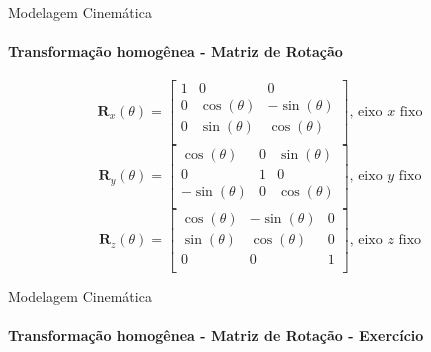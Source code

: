 \documentclass{beamer}
\begin{document}
\begin{frame}{Modelagem Cinemática}
    \framesubtitle{Transformação homogênea - Matriz de Rotação}
    \begin{block}{}
        \begin{equation*}
            \mathbf{R}_x(\theta) =
            \begin{bmatrix}
                1 & 0            & 0             \\
                0 & \cos(\theta) & -\sin(\theta) \\
                0 & \sin(\theta) & \cos(\theta)  \\
            \end{bmatrix} \text{, eixo $x$ fixo}
        \end{equation*}
        \begin{equation*}
            \mathbf{R}_y(\theta) =
            \begin{bmatrix}
                \cos(\theta)  & 0 & \sin(\theta) \\
                0             & 1 & 0            \\
                -\sin(\theta) & 0 & \cos(\theta) \\
            \end{bmatrix} \text{, eixo $y$ fixo}
        \end{equation*}
        \begin{equation*}
            \mathbf{R}_z(\theta) =
            \begin{bmatrix}
                \cos(\theta) & -\sin(\theta) & 0 \\
                \sin(\theta) & \cos(\theta) & 0 \\
                0            & 0            & 1 \\
            \end{bmatrix} \text{, eixo $z$ fixo}
        \end{equation*}
    \end{block}
\end{frame}

\begin{frame}{Modelagem Cinemática}
    \framesubtitle{Transformação homogênea - Matriz de Rotação - Exercício}
\end{frame}
\end{document}
